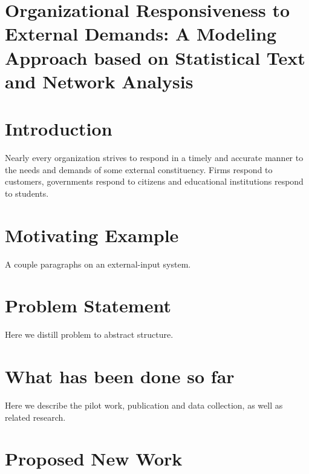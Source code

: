 

\section*{\Large Organizational Responsiveness to External Demands:  A Modeling Approach based on Statistical Text and Network Analysis}



\section{Introduction}

Nearly every organization strives to respond in a timely and accurate manner to the needs and demands of some external constituency. Firms respond to customers, governments respond to citizens and educational institutions respond to students. 

\section{Motivating Example}

A couple paragraphs on an external-input system.

\section{Problem Statement}

Here we distill problem to abstract structure.

\section{What has been done so far}

Here we describe the pilot work, publication and data collection, as well as related research.

\section{Proposed New Work}

